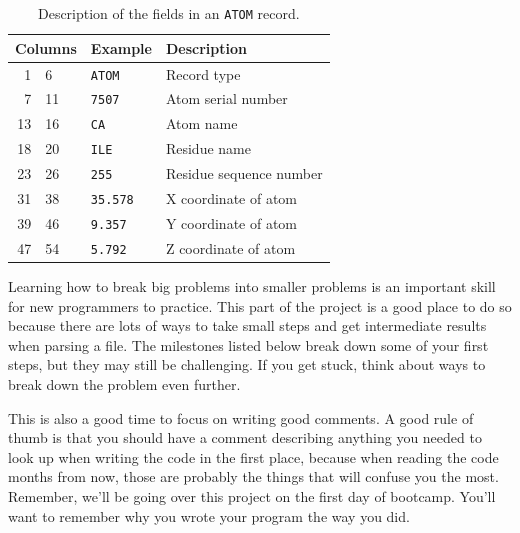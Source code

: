 \documentclass{article}
\begin{document}
\begin{table}[h]
\centering
\begin{tabular}{r@{ - }lcll}
\toprule
\multicolumn{3}{l}{Columns} & Example         & Description                         \\
\midrule
 1 &  6 & & \texttt{ATOM}   & Record type                         \\
 7 & 11 & & \texttt{7507}   & Atom serial number                  \\
13 & 16 & & \texttt{CA}     & Atom name                           \\
18 & 20 & & \texttt{ILE}    & Residue name                        \\
23 & 26 & & \texttt{255}    & Residue sequence number             \\
31 & 38 & & \texttt{35.578} & X coordinate of atom                \\
39 & 46 & & \texttt{9.357}  & Y coordinate of atom                \\
47 & 54 & & \texttt{5.792}  & Z coordinate of atom                \\
\bottomrule
\end{tabular}
\caption{Description of the fields in an \texttt{ATOM} record.}
\label{tab:pdb-atom-record}
\end{table}

Learning how to break big problems into smaller problems is an important skill 
for new programmers to practice.  This part of the project is a good place to 
do so because there are lots of ways to take small steps and get intermediate 
results when parsing a file.  The milestones listed below break down some of 
your first steps, but they may still be challenging.  If you get stuck, think 
about ways to break down the problem even further.

This is also a good time to focus on writing good comments.  A good rule of 
thumb is that you should have a comment describing anything you needed to look 
up when writing the code in the first place, because when reading the code 
months from now, those are probably the things that will confuse you the most.  
Remember, we'll be going over this project on the first day of bootcamp.  
You'll want to remember why you wrote your program the way you did.
\end{document}
